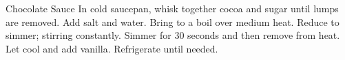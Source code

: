 \documentclass[../cookbook.tex]{subfiles}
\begin{document}
\begin{recipe}{Chocolate Sauce}{}{}
    In cold saucepan, whisk together cocoa and sugar until lumps are removed.
    Add salt and water. Bring to a boil over medium heat. Reduce to simmer; stirring constantly. Simmer for 30 seconds and then remove from heat.
    Let cool and add vanilla. Refrigerate until needed.
\end{recipe}
\end{document}
